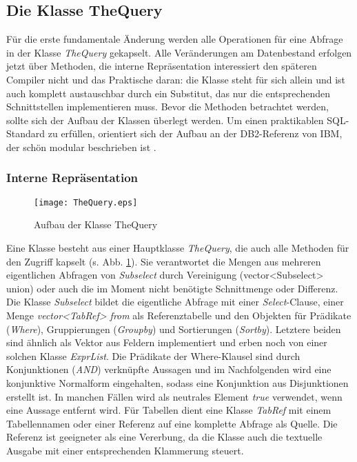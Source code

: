 \subsection{Die Klasse TheQuery}
Für die erste fundamentale Änderung werden alle Operationen für eine Abfrage in der Klasse \textit{TheQuery} gekapselt. Alle Veränderungen am Datenbestand erfolgen jetzt über Methoden, die interne Repräsentation interessiert den späteren Compiler nicht und das Praktische daran: die Klasse steht für sich allein und ist auch komplett austauschbar durch ein Substitut, das nur die entsprechenden Schnittstellen implementieren muss.
Bevor die Methoden betrachtet werden, sollte sich der Aufbau der Klassen überlegt werden. Um einen praktikablen SQL-Standard zu erfüllen, orientiert sich der Aufbau an der DB2-Referenz von IBM, der schön modular beschrieben ist \cite{db2}.

\subsubsection{Interne Repräsentation}
\begin{figure}[h]
\centering
\texttt{[image: TheQuery.eps]}
\caption{Aufbau der Klasse TheQuery}
\label{fig:TheQuery}
\end{figure}
Eine Klasse besteht aus einer Hauptklasse \textit{TheQuery}, die auch alle Methoden für den Zugriff kapselt (s. Abb. \ref{fig:TheQuery}). Sie verantwortet die Mengen aus mehreren eigentlichen Abfragen von \textit{Subselect} durch Vereinigung (vector<Subselect> union) oder auch die im Moment nicht benötigte Schnittmenge oder Differenz.
Die Klasse \textit{Subselect} bildet die eigentliche Abfrage mit einer \textit{Select}-Clause, einer Menge \textit{vector<TabRef> from} als Referenztabelle und den Objekten für Prädikate (\textit{Where}), Gruppierungen (\textit{Groupby}) und Sortierungen (\textit{Sortby}). Letztere beiden sind ähnlich als Vektor aus Feldern implementiert und erben noch von einer solchen Klasse \textit{ExprList}. Die Prädikate der Where-Klausel sind durch Konjunktionen (\textit{AND}) verknüpfte Aussagen und im Nachfolgenden wird eine konjunktive Normalform eingehalten, sodass eine Konjunktion aus Disjunktionen erstellt ist. In manchen Fällen wird als neutrales Element \textit{true} verwendet, wenn eine Aussage entfernt wird. Für Tabellen dient eine Klasse \textit{TabRef} mit einem Tabellennamen oder einer Referenz auf eine komplette Abfrage als Quelle. Die Referenz ist geeigneter als eine Vererbung, da die Klasse auch die textuelle Ausgabe mit einer entsprechenden Klammerung steuert.

